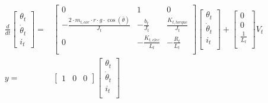 \documentclass[../../main]{subfiles}
\begin{document}
\begin{equation}
      \label{eq:ss_topframe_Genereal_model}
      \begin{split}
      \frac{d}{dt}
    \begin{bmatrix}
        \theta_t \\
        \dot \theta_t \\
        i_t
    \end{bmatrix}
    =&
    \begin{bmatrix}
        0 & 1               & 0             \\
        -\frac{2\cdot m_{t,cor} \cdot r \cdot g \cdot \cos(\bar \theta)}{J_t} & -\frac{b_t}{J_t}    & \frac{K_{t,torque}}{J_t} \\
        0 & -\frac{K_{t,elec}}{L_t}  & -\frac{R_t}{L_t}  \\
    \end{bmatrix}
    \begin{bmatrix}
        \theta_t \\
        \dot \theta_t \\
        i_t \\
    \end{bmatrix}
    +
    \begin{bmatrix}
        0 \\
        0 \\
        \frac{1}{L_t} \\
    \end{bmatrix}
    V_t
\\
      y =&
    \begin{bmatrix}
        1 & 0 & 0
    \end{bmatrix}
    \begin{bmatrix}
        \theta_t \\
        \dot \theta_t\\
        i_t\\
    \end{bmatrix}
    \end{split}
\end{equation}
\end{document}
